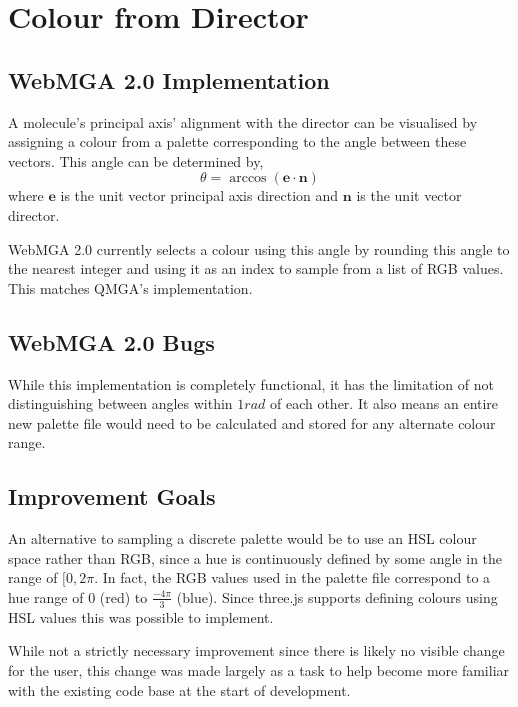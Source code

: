 \section{Colour from Director}
\label{colour_director}
\subsection{WebMGA 2.0 Implementation}
A molecule's principal axis' alignment with the director can be visualised by assigning a colour from a palette corresponding to the angle between these vectors. This angle can be determined by,
\begin{equation}
\theta=\arccos( \mathbf{e}\cdot \mathbf{n})
\label{theta_gen}
\end{equation}
where $\mathbf{e}$ is the unit vector principal axis direction and $\mathbf{n}$ is the unit vector director.

WebMGA 2.0 currently selects a colour using this angle by rounding this angle to the nearest integer and using it as an index to sample from a list of RGB values. This matches QMGA's implementation.

\subsection{WebMGA 2.0 Bugs}
While this implementation is completely functional, it has the limitation of not distinguishing between angles within $1 rad$ of each other. It also means an entire new palette file would need to be calculated and stored for any alternate colour range.

\subsection{Improvement Goals}
An alternative to sampling a discrete palette would be to use an HSL colour space rather than RGB, since a hue is continuously defined by some angle in the range of $[0, 2\pi$. In fact, the RGB values used in the palette file correspond to a hue range of $0$ (red) to $\frac{-4\pi}{3}$ (blue). Since three.js supports defining colours using HSL values\cite{three_colour} this was possible to implement.

While not a strictly necessary improvement since there is likely no visible change for the user, this change was made largely as a task to help become more familiar with the existing code base at the start of development.

